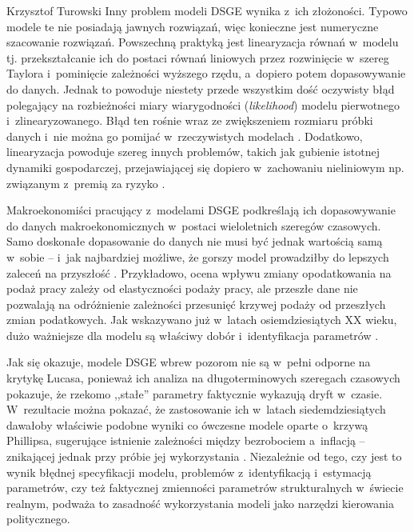 \begin{artplenv}{Krzysztof Turowski}
Inny problem modeli DSGE wynika z~ich złożoności. Typowo modele te nie posiadają jawnych rozwiązań, więc konieczne jest
numeryczne szacowanie rozwiązań. Powszechną praktyką jest linearyzacja równań w~modelu tj. przekształcanie ich do
postaci równań liniowych przez rozwinięcie w~szereg Taylora i~pominięcie zależności wyższego rzędu, a~dopiero potem
dopasowywanie do danych. Jednak to powoduje niestety przede wszystkim dość oczywisty błąd polegający na rozbieżności
miary wiarygodności (\textit{likelihood}) modelu pierwotnego i~zlinearyzowanego. Błąd ten rośnie wraz ze zwiększeniem
rozmiaru próbki danych i~nie można go pomijać w~rzeczywistych modelach
\parencite{fernandezvillaverde_convergence_2006}.
Dodatkowo, linearyzacja powoduje szereg innych problemów, takich jak gubienie istotnej dynamiki
gospodarczej, przejawiającej się dopiero w~zachowaniu nieliniowym np. związanym z~premią za ryzyko
\parencite{dou_macroeconomic_2017}.

Makroekonomiści pracujący z~modelami DSGE podkreślają ich dopasowywanie do danych makroekonomicznych w~postaci
wieloletnich szeregów czasowych. Samo doskonałe dopasowanie do danych nie musi być jednak wartością samą w~sobie
 --  i~jak najbardziej możliwe, że gorszy model prowadziłby do lepszych zaleceń na przyszłość
\parencite{kocherlakota_model_2007}.
Przykładowo, ocena wpływu zmiany opodatkowania na podaż pracy zależy od
elastyczności podaży pracy, ale przeszłe dane nie pozwalają na odróżnienie zależności przesunięć krzywej podaży od
przeszłych zmian podatkowych. Jak wskazywano już w~latach osiemdziesiątych XX wieku, dużo ważniejsze dla modelu są
właściwy dobór i~identyfikacja parametrów
\parencite{sims_macroeconomics_1980}.

Jak się okazuje, modele DSGE wbrew pozorom nie są w~pełni odporne na krytykę Lucasa, ponieważ ich analiza na
długoterminowych szeregach czasowych pokazuje, że rzekomo ,,stałe'' parametry faktycznie wykazują
dryft w~czasie. W~rezultacie można pokazać, że zastosowanie ich w~latach siedemdziesiątych dawałoby
właściwie podobne wyniki co ówczesne
modele oparte o~krzywą Phillipsa, sugerujące istnienie zależności między bezrobociem a~inflacją  --  znikającej
jednak przy próbie jej wykorzystania
\parencite{hurtado_dsge_2014}.
Niezależnie od tego, czy jest to wynik
błędnej specyfikacji modelu, problemów z~identyfikacją i~estymacją parametrów, czy też faktycznej zmienności parametrów
strukturalnych w~świecie realnym, podważa to zasadność wykorzystania modeli jako narzędzi kierowania politycznego.


\end{artplenv}
